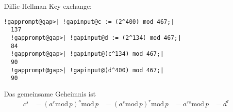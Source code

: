Diffie-Hellman Key exchange:

\begin{Verbatim}[commandchars=!@|,fontsize=\small,frame=single,label=Example]
  !gapprompt@gap>| !gapinput@c := (2^400) mod 467;|
  137
  !gapprompt@gap>| !gapinput@d := (2^134) mod 467;|
  84
  !gapprompt@gap>| !gapinput@(c^134) mod 467;|
  90
  !gapprompt@gap>| !gapinput@(d^400) mod 467;|
  90
\end{Verbatim}

Das gemeinsame Geheimnis ist
\begin{align*}
c^s &= (a^r \mathrm{mod}\, p)^s \mathrm{mod}\, p &= (a^s \mathrm{mod}\, p)^r \mathrm{mod}\, p &=  a^{rs} \mathrm{mod}\, p &= d^r
\end{align*}